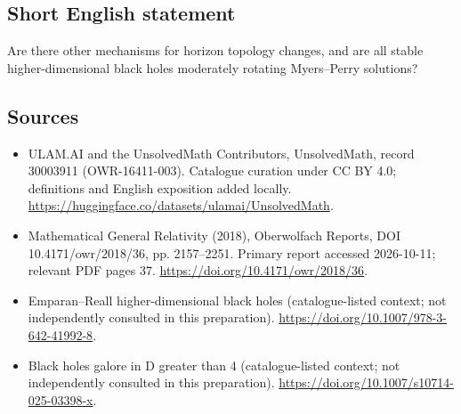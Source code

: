 \documentclass[11pt]{article}
\begin{document}
\subsection{Short English statement}
Are there other mechanisms for horizon topology changes, and are all stable higher-dimensional black holes moderately rotating Myers--Perry solutions?
\subsection{Sources}
\begin{itemize}
\item[\hypertarget{source:30003911:1}{S1}] ULAM.AI and the UnsolvedMath Contributors, UnsolvedMath, record 30003911 (OWR-16411-003). Catalogue curation under CC BY 4.0; definitions and English exposition added locally.
\url{https://huggingface.co/datasets/ulamai/UnsolvedMath}.
\item[\hypertarget{source:30003911:2}{S2}] Mathematical General Relativity (2018), Oberwolfach Reports, DOI 10.4171/owr/2018/36, pp. 2157--2251. Primary report accessed 2026-10-11; relevant PDF pages 37.
\url{https://doi.org/10.4171/owr/2018/36}.
\item[\hypertarget{source:30003911:3}{S3}] Emparan--Reall higher-dimensional black holes (catalogue-listed context; not independently consulted in this preparation).
\url{https://doi.org/10.1007/978-3-642-41992-8}.
\item[\hypertarget{source:30003911:4}{S4}] Black holes galore in D greater than 4 (catalogue-listed context; not independently consulted in this preparation).
\url{https://doi.org/10.1007/s10714-025-03398-x}.
\end{itemize}
\label{end:30003911}
\end{document}
